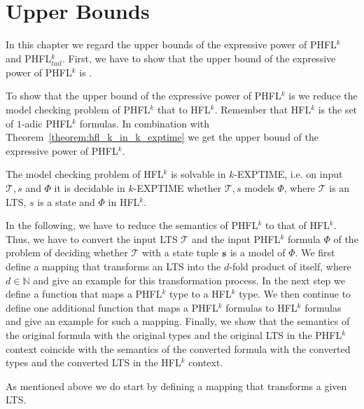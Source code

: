 
\chapter{Upper Bounds}\label{ch:upperBounds}

In this chapter we regard the upper bounds of the expressive power of PHFL$^k$ and PHFL$^k_{tail}$. First, we have to show that the upper
bound of the expressive power of PHFL$^k$ is .

To show that the upper bound of the expressive power of PHFL$^k$ is  we reduce the model checking
problem of PHFL$^k$ that to HFL$^k$. Remember that HFL$^k$ is the set of $1$-adic PHFL$^k$
formulas. In combination with Theorem~\ref{theorem:hfl_k_in_k_exptime} we get the upper bound of the expressive power of PHFL$^k$.

\begin{theorem}{\cite{axelsson2007complexity}}
    \label{theorem:hfl_k_in_k_exptime}
	The model checking problem of HFL$^k$ is solvable in $k$-EXPTIME, i.e. on input $\mathcal{T}, s$ and $\Phi$ it is decidable in $k$-EXPTIME whether $\mathcal{T}, s$ models $\Phi$, where $\mathcal{T}$ is an LTS, $s$ is a state and $\Phi$ in HFL$^k$.
\end{theorem}

In the following, we have to reduce the semantics of PHFL$^k$ to that of HFL$^k$.
Thus, we have to convert the input LTS $\mathcal{T}$ and the input PHFL$^k$ formula $\Phi$ of the problem of deciding whether
$\mathcal{T}$ with a state tuple $\emph{s}$ is a model of $\Phi$. We first define a mapping that transforms an LTS into the $d$-fold product of itself, where $d \in \mathbb{N}$
 and give an example for this transformation process. In the next step we define a function that maps a
PHFL$^k$ type to a HFL$^k$ type. We then continue to define one additional function that maps a PHFL$^k$ formulas to
HFL$^k$ formulas and give an example for such a mapping. Finally, we show that the semantics of the original
formula with the original types and the original LTS in the PHFL$^k$ context coincide with the semantics of the
converted formula with the converted types and the converted LTS in the HFL$^k$ context.

As mentioned above we do start by defining a mapping that transforms a given LTS.

